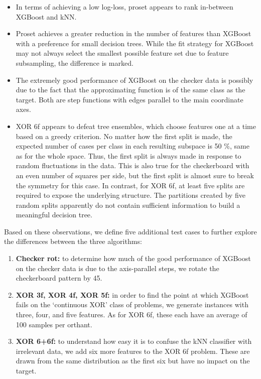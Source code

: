 \begin{itemize}
\item In terms of achieving a low log-loss, proset appears to rank in-between XGBoost and kNN.
%
\item Proset achieves a greater reduction in the number of features than XGBoost with a preference for small decision trees.
While the fit strategy for XGBoost may not always select the smallest possible feature set due to feature subsampling, the difference is marked.
%
\item The extremely good performance of XGBoost on the checker data is possibly due to the fact that the approximating function is of the same class as the target.
Both are step functions with edges parallel to the main coordinate axes.
%
\item XOR 6f appears to defeat tree ensembles, which choose features one at a time based on a greedy criterion.
No matter how the first split is made, the expected number of cases per class in each resulting subspace is 50 \%, same as for the whole space.
Thus, the first split is always made in response to random fluctuations in the data.
This is also true for the checkerboard with an even number of squares per side, but the first split is almost sure to break the symmetry for this case.
In contrast, for XOR 6f, at least five splits are required to expose the underlying structure.
The partitions created by five random splits apparently do not contain sufficient information to build a meaningful decision tree.
\end{itemize}
%
Based on these observations, we define five additional test cases to further explore the differences between the three algorithms:
%
\begin{enumerate}
\item\textbf{Checker rot:} to determine how much of the good performance of XGBoost on the checker data is due to the axis-parallel steps, we rotate the checkerboard pattern by 45\textdegree.
%
\item\textbf{XOR 3f, XOR 4f, XOR 5f:} in order to find the point at which XGBoost fails on the `continuous XOR' class of problems, we generate instances with three, four, and five features.
As for XOR 6f, these each have an average of 100 samples per orthant.
%
\item\textbf{XOR 6+6f:} to understand how easy it is to confuse the kNN classifier with irrelevant data, we add six more features to the XOR 6f problem.
These are drawn from the same distribution as the first six but have no impact on the target.
\end{enumerate}
